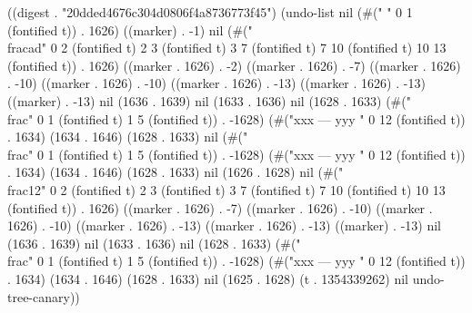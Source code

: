 
((digest . "20dded4676c304d0806f4a8736773f45") (undo-list nil (#("
" 0 1 (fontified t)) . 1626) ((marker) . -1) nil (#("  \\frac{a}{d}" 0 2 (fontified t) 2 3 (fontified t) 3 7 (fontified t) 7 10 (fontified t) 10 13 (fontified t)) . 1626) ((marker . 1626) . -2) ((marker . 1626) . -7) ((marker . 1626) . -10) ((marker . 1626) . -10) ((marker . 1626) . -13) ((marker . 1626) . -13) ((marker) . -13) nil (1636 . 1639) nil (1633 . 1636) nil (1628 . 1633) (#("\\frac" 0 1 (fontified t) 1 5 (fontified t)) . -1628) (#("xxx
---
yyy
" 0 12 (fontified t)) . 1634) (1634 . 1646) (1628 . 1633) nil (#("\\frac" 0 1 (fontified t) 1 5 (fontified t)) . -1628) (#("xxx
---
yyy
" 0 12 (fontified t)) . 1634) (1634 . 1646) (1628 . 1633) nil (1626 . 1628) nil (#("  \\frac{1}{2}" 0 2 (fontified t) 2 3 (fontified t) 3 7 (fontified t) 7 10 (fontified t) 10 13 (fontified t)) . 1626) ((marker . 1626) . -7) ((marker . 1626) . -10) ((marker . 1626) . -10) ((marker . 1626) . -13) ((marker . 1626) . -13) ((marker) . -13) nil (1636 . 1639) nil (1633 . 1636) nil (1628 . 1633) (#("\\frac" 0 1 (fontified t) 1 5 (fontified t)) . -1628) (#("xxx
---
yyy
" 0 12 (fontified t)) . 1634) (1634 . 1646) (1628 . 1633) nil (1625 . 1628) (t . 1354339262) nil undo-tree-canary))
